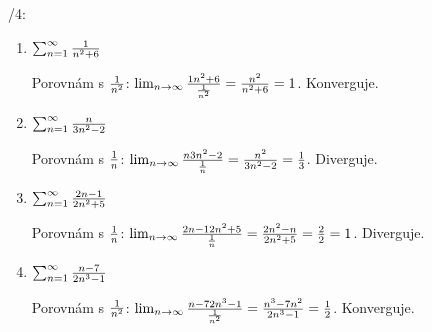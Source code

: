 /4:

\begin{enumerate}
	\item $\sum_{n=1}^{\infty} \frac 1{n^2+6}$

		Porovnám s $\frac 1{n^2}$:
		$\lim_{n\rightarrow\infty} \frac{1{n^2+6}}{\frac1{n^2}} = \frac{n^2}{n^2+6} = 1$.
		Konverguje.
	\item $\sum_{n=1}^{\infty} \frac n{3n^2-2}$

		Porovnám s $\frac 1{n}$:
		$\lim_{n\rightarrow\infty} \frac{n{3n^2-2}}{\frac1{n}} = \frac{n^2}{3n^2-2} = \frac 13$.
		Diverguje.
	\item $\sum_{n=1}^{\infty} \frac {2n-1}{2n^2+5}$

		Porovnám s $\frac 1{n}$:
		$\lim_{n\rightarrow\infty} \frac{{2n-1}{2n^2+5}}{\frac1{n}} = \frac{2n^2-n}{2n^2+5} = \frac 22 = 1$.
		Diverguje.
	\item $\sum_{n=1}^{\infty} \frac {n-7}{2n^3-1}$

		Porovnám s $\frac 1{n^2}$:
		$\lim_{n\rightarrow\infty} \frac{{n-7}{2n^3-1}}{\frac1{n^2}} = \frac{n^3-7n^2}{2n^3-1} = \frac 12$.
		Konverguje.
\end{enumerate}


\EndDoc
